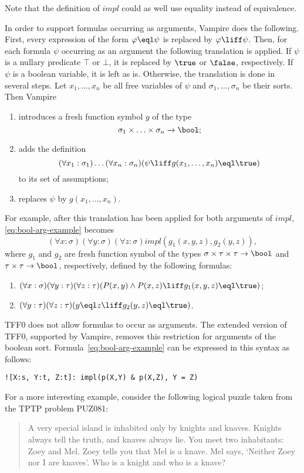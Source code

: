 Note that the definition of $\mathit{impl}$ could as well use equality instead of equivalence.

In order to support formulas occurring as arguments, Vampire does the following. First, every expression of the form $\varphi \eql \psi$ is replaced by $\varphi \liff \psi$. Then, for each formula $\psi$ occurring as an argument the following translation is applied. If $\psi$ is a nullary predicate $\top$ or $\bot$, it is replaced by $\true$ or $\false$, respectively. If $\psi$ is a boolean variable, it is left as is. Otherwise, the translation is done in several steps. Let $x_1,\ldots,x_n$ be all free variables of $\psi$ and $\sigma_1,\ldots,\sigma_n$ be their sorts. Then Vampire
\begin{enumerate}
  \item introduces a fresh function symbol $g$ of the type $$\sigma_1 \times \ldots \times \sigma_n \to \bool;$$
  \item adds the definition $$(\forall x_1:\sigma_1)\ldots(\forall x_n:\sigma_n)(\psi \liff g(x_1,\ldots,x_n) \eql \true)$$ to its set of assumptions;
  \item replaces $\psi$ by $g(x_1,\ldots,x_n)$.
\end{enumerate}

For example, after this translation has been applied for both arguments of $\mathit{impl}$, \eqref{eq:bool-arg-example} becomes $$(\forall x:\sigma)(\forall y:\sigma)(\forall z:\sigma)\mathit{impl}(g_1(x, y, z), g_2(y, z)),$$ where $g_1$ and $g_2$ are fresh function symbol of the types $\sigma \times \tau \times \tau \to \bool$ and $\tau \times \tau \to \bool$, respectively, defined by the following formulas:
\begin{enumerate}
  \item $(\forall x:\sigma)(\forall y:\tau)(\forall z:\tau)(P(x,y) \land P(x,z) \liff g_1(x,y,z) \eql \true)$;
  \item $(\forall y:\tau)(\forall z:\tau)(y \eql z \liff g_2(y,z) \eql \true)$.
\end{enumerate}

TFF0 does not allow formulas to occur as arguments. The extended version of TFF0, supported by Vampire, removes this restriction for arguments of the boolean sort. Formula~\eqref{eq:bool-arg-example} can be expressed in this syntax as follows:
\begin{lstlisting}
![X:s, Y:t, Z:t]: impl(p(X,Y) & p(X,Z), Y = Z)
\end{lstlisting}

For a more interesting example, consider the following logical puzzle taken from the TPTP problem \mbox{PUZ081}:
\begin{quote}
  A very special island is inhabited only by knights and knaves. Knights always tell the truth, and knaves always lie. You meet two inhabitants: Zoey and Mel. Zoey tells you that Mel is a knave. Mel says, `Neither Zoey nor I are knaves'. Who is a knight and who is a knave?
\end{quote}

